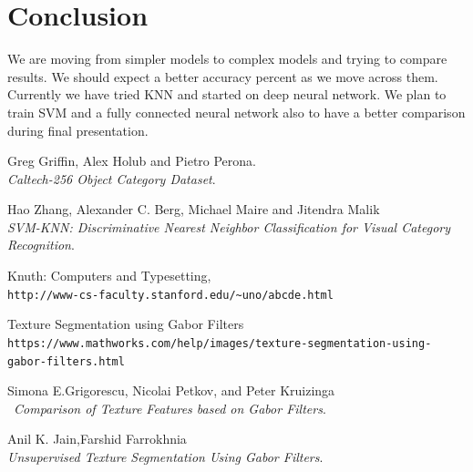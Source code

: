\documentclass{article} %
\begin{document}
\section{Conclusion}

We are moving from simpler models to complex models and trying to compare results. We should expect a better accuracy percent as we move across them. Currently we have tried KNN and started on deep neural network. We plan to train SVM and a fully connected neural network also to have a better comparison during final presentation.


\begin{thebibliography}{9}

Greg Griffin, Alex Holub and Pietro Perona. \\
\textit{Caltech-256 Object Category Dataset}. 
 
Hao Zhang, Alexander C. Berg, Michael Maire and Jitendra Malik \\
\textit{SVM-KNN: Discriminative Nearest Neighbor Classification for Visual Category
Recognition}.
 
Knuth: Computers and Typesetting,
\\\texttt{http://www-cs-faculty.stanford.edu/\~{}uno/abcde.html}

Texture Segmentation using Gabor Filters
\\\texttt{https://www.mathworks.com/help/images/texture-segmentation-using-gabor-filters.html}

Simona E.Grigorescu, Nicolai Petkov, and Peter Kruizinga\\\
\textit{Comparison of Texture Features based on Gabor Filters}. 

Anil K. Jain,Farshid Farrokhnia
\\
\textit{Unsupervised Texture Segmentation Using Gabor
Filters}. 


\end{thebibliography}
\end{document}
